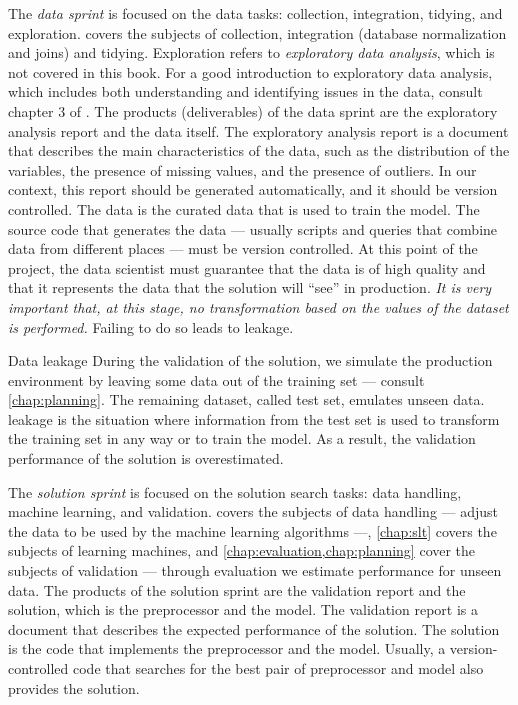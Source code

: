 The \emph{data sprint} is focused on the data tasks: collection, integration, tidying, and
exploration.   covers the subjects of collection, integration (database
normalization and joins) and tidying.  Exploration refers to \emph{exploratory
data analysis}, which is not covered in this book. %
For a good introduction to exploratory data analysis, which includes both understanding
and identifying issues in the data, consult chapter 3 of
\textcite{Zumel2019}.
The products (deliverables) of the data sprint are the exploratory analysis report and the
data itself.  The exploratory analysis report is a document that describes the main
characteristics of the data, such as the distribution of the variables, the presence of
missing values, and the presence of outliers.  In our context, this report should be
generated automatically, and it should be version controlled.  The data is the curated
data that is used to train the model.  The source code that generates the data ---
usually scripts and queries that combine data from different places --- must be version
controlled.  At this point of the project, the data scientist must guarantee that the data
is of high quality and that it represents the data that the solution will ``see'' in
production.  \emph{It is very important that, at this stage, no transformation based
on the values of the dataset is performed.}  Failing to do so leads to \gls{leakage}.

\begin{defbox}{Data leakage}{}
  During the validation of the solution, we simulate the production environment by leaving
  some data out of the training set --- consult \cref{chap:planning}.  The remaining
  dataset, called test set, emulates unseen data.  \Gls{leakage} is the situation where
  information from the test set is used to transform the training set in any way or to
  train the model.  As a result, the validation performance of the solution is
  overestimated.
\end{defbox}

The \emph{solution sprint} is focused on the solution search tasks: data handling, machine
learning, and validation.   covers the subjects of data handling ---
adjust the data to be used by the machine learning algorithms ---, \cref{chap:slt}
covers the subjects of learning machines, and \cref{chap:evaluation,chap:planning} cover
the subjects of validation --- through evaluation we estimate performance for unseen
data.  The products of the solution sprint are the validation report and the solution,
which is the preprocessor and the model.  The validation report is a document that
describes the expected performance of the solution.  The solution is the code that
implements the preprocessor and the model.  Usually, a version-controlled code that
searches for the best pair of preprocessor and model also provides the solution.

